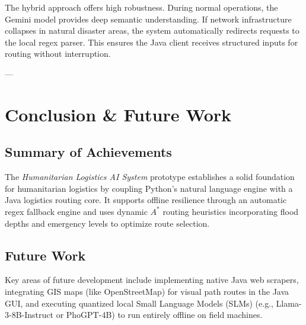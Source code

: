 \documentclass[12pt,a4paper]{article}
\begin{document}
\begin{table}[h!]
\centering
\caption{Evaluation Summary: Gemini LLM vs. Local Fallback}
\label{tab:evaluation}
\vspace{0.2cm} %
\end{table}

The hybrid approach offers high robustness. During normal operations, the Gemini model provides deep semantic understanding. If network infrastructure collapses in natural disaster areas, the system automatically redirects requests to the local regex parser. This ensures the Java client receives structured inputs for routing without interruption.

---

\section{Conclusion \& Future Work}

\subsection{Summary of Achievements}
The \textit{Humanitarian Logistics AI System} prototype establishes a solid foundation for humanitarian logistics by coupling Python's natural language engine with a Java logistics routing core. It supports offline resilience through an automatic regex fallback engine and uses dynamic $A^*$ routing heuristics incorporating flood depths and emergency levels to optimize route selection.

\subsection{Future Work}
Key areas of future development include implementing native Java web scrapers, integrating GIS maps (like OpenStreetMap) for visual path routes in the Java GUI, and executing quantized local Small Language Models (SLMs) (e.g., Llama-3-8B-Instruct or PhoGPT-4B) to run entirely offline on field machines.
\end{document}
